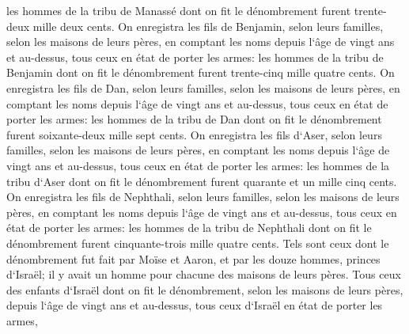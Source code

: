 \verse les hommes de la tribu de Manassé dont on fit le dénombrement furent trente-deux mille deux cents. 
\verse On enregistra les fils de Benjamin, selon leurs familles, selon les maisons de leurs pères, en comptant les noms depuis l`âge de vingt ans et au-dessus, tous ceux en état de porter les armes: 
\verse les hommes de la tribu de Benjamin dont on fit le dénombrement furent trente-cinq mille quatre cents. 
\verse On enregistra les fils de Dan, selon leurs familles, selon les maisons de leurs pères, en comptant les noms depuis l`âge de vingt ans et au-dessus, tous ceux en état de porter les armes: 
\verse les hommes de la tribu de Dan dont on fit le dénombrement furent soixante-deux mille sept cents. 
\verse On enregistra les fils d`Aser, selon leurs familles, selon les maisons de leurs pères, en comptant les noms depuis l`âge de vingt ans et au-dessus, tous ceux en état de porter les armes: 
\verse les hommes de la tribu d`Aser dont on fit le dénombrement furent quarante et un mille cinq cents. 
\verse On enregistra les fils de Nephthali, selon leurs familles, selon les maisons de leurs pères, en comptant les noms depuis l`âge de vingt ans et au-dessus, tous ceux en état de porter les armes: 
\verse les hommes de la tribu de Nephthali dont on fit le dénombrement furent cinquante-trois mille quatre cents. 
\verse Tels sont ceux dont le dénombrement fut fait par Moïse et Aaron, et par les douze hommes, princes d`Israël; il y avait un homme pour chacune des maisons de leurs pères. 
\verse Tous ceux des enfants d`Israël dont on fit le dénombrement, selon les maisons de leurs pères, depuis l`âge de vingt ans et au-dessus, tous ceux d`Israël en état de porter les armes, 
